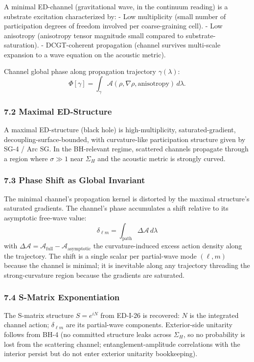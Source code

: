 \documentclass[
  11pt,
  a4paper,
]{article}
\begin{document}
A minimal ED-channel (gravitational wave, in the continuum reading) is a
substrate excitation characterized by: - Low multiplicity (small number
of participation degrees of freedom involved per coarse-graining cell).
- Low anisotropy (anisotropy tensor magnitude small compared to
substrate-saturation). - DCGT-coherent propagation (channel survives
multi-scale expansion to a wave equation on the acoustic metric).

Channel global phase along propagation trajectory \(\gamma(\lambda)\):
\[
\Phi[\gamma] = \int_\gamma \mathcal{A}(\rho,\nabla\rho,\text{anisotropy})\,d\lambda.
\]

\subsubsection{7.2 Maximal ED-Structure}\label{maximal-ed-structure}

A maximal ED-structure (black hole) is high-multiplicity,
saturated-gradient, decoupling-surface-bounded, with curvature-like
participation structure given by SG-4 / Arc SG. In the BH-relevant
regime, scattered channels propagate through a region where
\(\sigma \gg 1\) near \(\Sigma_H\) and the acoustic metric is strongly
curved.

\subsubsection{7.3 Phase Shift as Global
Invariant}\label{phase-shift-as-global-invariant}

The minimal channel's propagation kernel is distorted by the maximal
structure's saturated gradients. The channel's phase accumulates a shift
relative to its asymptotic free-wave value: \[
\delta_{\ell m} = \int_\mathrm{path}\Delta\mathcal{A}\,d\lambda
\] with
\(\Delta\mathcal{A} = \mathcal{A}_\mathrm{full} - \mathcal{A}_\mathrm{asymptotic}\)
the curvature-induced excess action density along the trajectory. The
shift is a single scalar per partial-wave mode \((\ell,m)\) because the
channel is minimal; it is inevitable along any trajectory threading the
strong-curvature region because the gradients are saturated.

\subsubsection{7.4 S-Matrix
Exponentiation}\label{s-matrix-exponentiation}

The S-matrix structure \(S = e^{iN}\) from ED-I-26 is recovered: \(N\)
is the integrated channel action; \(\delta_{\ell m}\) are its
partial-wave components. Exterior-side unitarity follows from BH-4 (no
committed structure leaks across \(\Sigma_H\), so no probability is lost
from the scattering channel; entanglement-amplitude correlations with
the interior persist but do not enter exterior unitarity bookkeeping).
\end{document}

